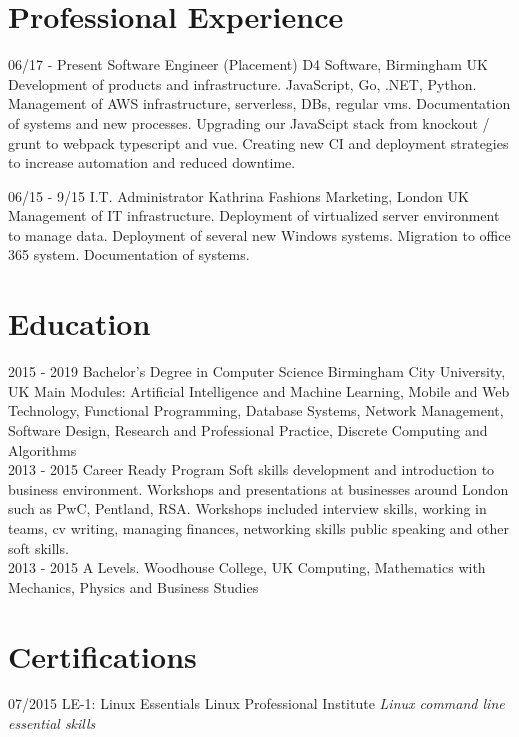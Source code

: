 \documentclass[]{friggeri-cv}
\begin{document}
\section{Professional Experience}
\begin{entrylist}
  \entry
    {06/17 - Present}
    {Software Engineer (Placement) }
    {D4 Software, Birmingham UK}
    {Development of products and infrastructure.
JavaScript, Go, .NET, Python.
Management of AWS infrastructure, serverless, DBs, regular vms.
Documentation of systems and new processes. Upgrading our
JavaScipt stack from knockout / grunt to webpack typescript and vue. Creating new CI and deployment strategies to increase automation and reduced downtime.\\}

  \entry
    {06/15 - 9/15}
    {I.T. Administrator}
    {Kathrina Fashions Marketing, London UK}
    {Management of IT infrastructure.
Deployment of virtualized server environment to manage data.
Deployment of several new Windows systems.
Migration to office 365 system.
Documentation of systems.\\}

\end{entrylist}

\section{Education}
\begin{entrylist}
  \entry
    {2015 - 2019}
    {Bachelor's Degree in Computer Science}
    {Birmingham City University, UK}
    {Main Modules: Artificial Intelligence and Machine Learning, Mobile and Web Technology, Functional Programming, Database Systems, Network Management, Software Design, Research and Professional Practice, Discrete Computing and Algorithms\\}
  \entry
    {2013 - 2015}
    {Career Ready Program}
    {}
    {Soft skills development and introduction to business environment.
Workshops and presentations at businesses around London such as PwC, Pentland, RSA.
Workshops included interview skills, working in teams, cv writing, managing finances, networking skills public speaking and other soft skills.\\}
  \entry
    {2013 - 2015}
    {A Levels.}
    {Woodhouse College, UK}
    {Computing, Mathematics with Mechanics, Physics and Business Studies}
\end{entrylist}

\section{Certifications}
\begin{entrylist}
  \entry
    {07/2015}
    {LE-1: Linux Essentials}
    {Linux Professional Institute}
    {\emph{Linux command line essential skills}}
\end{entrylist}
\end{document}
